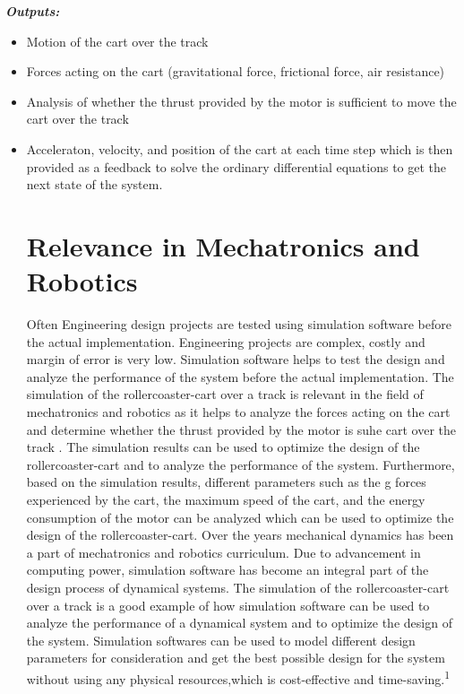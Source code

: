 \documentclass{article}
\begin{document}
    \textbf{\textit{Outputs:}} \begin{itemize} \item Motion of the cart over the
    track \item Forces acting on the cart (gravitational force, frictional force,
    air resistance) \item Analysis of whether the thrust provided by the motor is
    sufficient to move the cart over the track \item Acceleraton, velocity, and position
    of the cart at each time step which is then provided as a feedback to solve the
    ordinary differential equations to get the next state of the system.

    \section{Relevance in Mechatronics and Robotics}
    Often Engineering design projects are tested using simulation software before
    the actual implementation. Engineering projects are complex, costly and margin
    of error is very low. Simulation software helps to test the design and
    analyze the performance of the system before the actual implementation. The simulation
    of the rollercoaster-cart over a track is relevant in the field of mechatronics
    and robotics as it helps to analyze the forces acting on the cart and determine
    whether the thrust provided by the motor is suhe cart over the track . The simulation
    results can be used to optimize the design of the rollercoaster-cart and to analyze
    the performance of the system. Furthermore, based on the simulation results,
    different parameters such as the g forces experienced by the cart, the maximum
    speed of the cart, and the energy consumption of the motor can be analyzed
    which can be used to optimize the design of the rollercoaster-cart. Over the
    years mechanical dynamics has been a part of mechatronics and robotics curriculum.
    Due to advancement in computing power, simulation software has become an integral
    part of the design process of dynamical systems. The simulation of the
    rollercoaster-cart over a track is a good example of how simulation software
    can be used to analyze the performance of a dynamical system and to optimize
    the design of the system. Simulation softwares can be used to model different
    design parameters for consideration and get the best possible design for the
    system without using any physical resources,which is cost-effective and time-saving.\textsuperscript{1}


\end{itemize}
\end{document}
